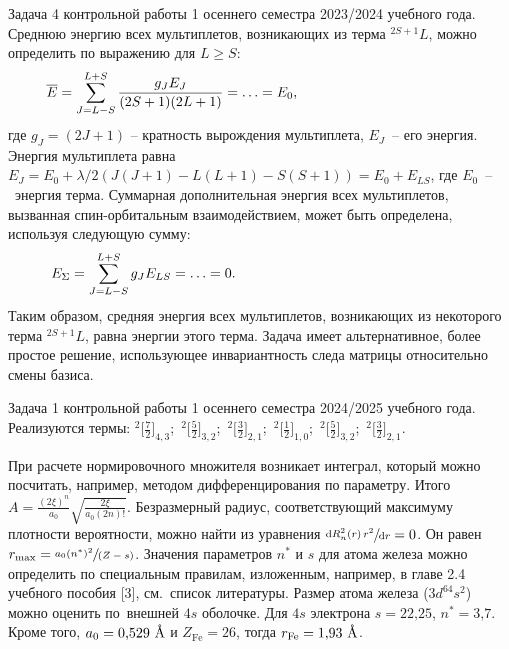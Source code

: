  Задача 4 контрольной работы 1 осеннего семестра 2023/2024 учебного года. Среднюю энергию всех мультиплетов, возникающих из терма $^{2S+1}L$, можно определить по выражению для $L\geq S$:
\begin{equation*}
\begin{aligned}
&\overline E=\sum_{J=L-S}^{L+S} \dfrac{g_JE_J}{(2S+1)(2L+1)} = \ldots = E_0,\hspace{41mm}
\end{aligned}
\end{equation*}
где $g_J=(2J+1)$ – кратность вырождения мультиплета, $E_J$~– его энергия. Энергия мультиплета равна $E_J=E_0+\lambda/2 ( J(J+1)-L(L+1)-S(S+1) )=E_0+E_{LS}$, где $E_0$~–~энергия терма. Суммарная дополнительная энергия всех мультиплетов, вызванная спин-орбитальным взаимодействием, может быть определена, используя следующую сумму:
\begin{equation*}
\begin{aligned}
&E_{\Sigma}=\sum_{J=L-S}^{L+S} g_JE_{LS} = \ldots = 0.\hspace{55mm}
\end{aligned}
\end{equation*}
Таким образом, средняя энергия всех мультиплетов, возникающих из некоторого терма $^{2S+1}L$, равна энергии этого терма. Задача имеет альтернативное, более простое решение, использующее инвариантность следа матрицы относительно смены базиса.
\par
{} Задача 1 контрольной работы 1 осеннего семестра 2024/2025 учебного года. Реализуются термы: ${^2}\Big[ \frac{7}{2}\Big]_{4,3}$;\, ${^2}\Big[ \frac{5}{2}\Big]_{3,2}$;\, ${^2}\Big[ \frac{3}{2}\Big]_{2,1}$;\, ${^2}\Big[ \frac12\Big]_{1,0}$;\, ${^2}\Big[ \frac{5}{2}\Big]_{3,2}$;\, ${^2}\Big[ \frac{3}{2}\Big]_{2,1}.$\par
{} При расчете нормировочного множителя возникает интеграл, который можно посчитать, например, методом дифференцирования по параметру. Итого $A=\frac{(2\xi)^n}{a_0} \sqrt{\frac{2 \xi}{a_0 (2n)!}}$. Безразмерный радиус, соответствующий максимуму плотности вероятности, можно найти из уравнения $\sfrac{\text{d} R_n^2(r)\,r^2 }{\text{d}r} = 0$. Он равен $r_{\text{max}}=\sfrac{a_0(n^*)^2}{(Z-s)}$. Значения параметров $n^*$ и $s$ для атома железа можно определить по специальным правилам, изложенным, например, в главе 2.4 учебного пособия [3], см.~список литературы. Размер атома железа ($3d^64s^2$) можно оценить по~внешней $4s$ оболочке. Для $4s$ электрона $s = \text{22,25}$, $n^*=\text{3,7}$. Кроме того, $a_0=\text{0,529}\,\,\text{\r{A}}$ и $Z_{\text{Fe}}=\text{26}$, тогда $r_{\text{Fe}}=\text{1,93}\,\,\text{\r{A}}$.

